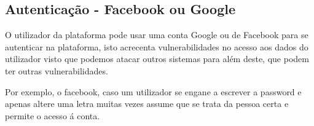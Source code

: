 \subsection{Autenticação - Facebook ou Google}

\par O utilizador da plataforma pode usar uma conta Google ou de Facebook para se autenticar na plataforma, isto acrecenta vulnerabilidades no acesso aos dados do utilizador visto que podemos atacar outros sistemas para além deste, que podem ter outras vulnerabilidades.
\par Por exemplo, o facebook, caso um utilizador se engane a escrever a password e apenas altere uma letra muitas vezes assume que se trata da pessoa certa e permite o acesso á conta.



